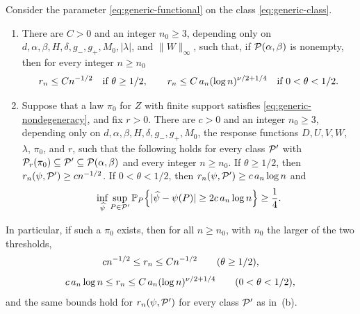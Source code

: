 \begin{theorem}
\label{thm:generic}
Consider the parameter \eqref{eq:generic-functional} on the class
\eqref{eq:generic-class}.
\begin{enumerate}[label=(\alph*)]
\item There are $C>0$ and an integer $n_0\ge3$, depending only on
$d,\alpha,\beta,H,\delta,g_-,g_+,M_0,|\lambda|$, and $\|W\|_\infty$,
such that, if $\mathcal P(\alpha,\beta)$ is nonempty, then for every integer
$n\ge n_0$
\begin{equation}\label{eq:upper-rates}
 r_n\le Cn^{-1/2}\quad\text{if }\theta\ge1/2,\qquad
 r_n\le C\,a_n(\log n)^{\nu/2+1/4}\quad\text{if }0<\theta<1/2.
\end{equation}
\item Suppose that a law $\pi_0$ for $Z$ with finite support satisfies
\eqref{eq:generic-nondegeneracy}, and fix $r>0$. There are $c>0$ and an
integer $n_0\ge3$, depending only on
$d,\alpha,\beta,H,\delta,g_-,g_+,M_0$, the response functions
$D,U,V,W$, $\lambda$, $\pi_0$, and $r$, such that the following holds
for every class $\mathcal P'$ with
$\mathcal P_r(\pi_0)\subseteq\mathcal P'\subseteq\mathcal P(\alpha,\beta)$ and every integer
$n\ge n_0$. If $\theta\ge1/2$, then $r_n(\psi,\mathcal P')\ge cn^{-1/2}$. If
$0<\theta<1/2$, then $r_n(\psi,\mathcal P')\ge c\,a_n\log n$ and
\begin{equation}\label{eq:sharp-probability}
 \inf_{\widehat\psi}\sup_{P\in\mathcal P'}
 \mathbb P_P\!\left\{
 |\widehat\psi-\psi(P)|\ge
 2c\,a_n\log n
 \right\}\ge\frac14.
\end{equation}
\end{enumerate}
In particular, if such a $\pi_0$ exists, then for all $n\ge n_0$, with
$n_0$ the larger of the two thresholds,
\begin{equation}\label{eq:critical-rate}
 c n^{-1/2}\le r_n\le C n^{-1/2}\qquad(\theta\ge1/2),
\end{equation}
\begin{equation}\label{eq:sharp-bracket}
 c\,a_n\log n\le r_n\le C\,a_n(\log n)^{\nu/2+1/4}
 \qquad(0<\theta<1/2),
\end{equation}
and the same bounds hold for $r_n(\psi,\mathcal P')$ for every class $\mathcal P'$
as in~(b).
\end{theorem}

